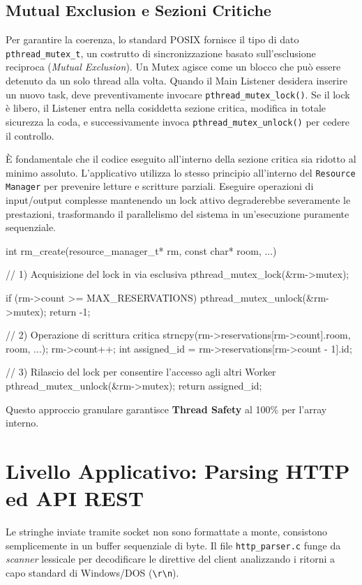 \documentclass[a4paper,12pt]{article}
\begin{document}
\subsection{Mutual Exclusion e Sezioni Critiche}
Per garantire la coerenza, lo standard POSIX fornisce il tipo di dato \texttt{pthread\_mutex\_t}, un costrutto di sincronizzazione basato sull'esclusione reciproca (\textit{Mutual Exclusion}). Un Mutex agisce come un blocco che può essere detenuto da un solo thread alla volta. Quando il Main Listener desidera inserire un nuovo task, deve preventivamente invocare \texttt{pthread\_mutex\_lock()}. Se il lock è libero, il Listener entra nella cosiddetta sezione critica, modifica in totale sicurezza la coda, e successivamente invoca \texttt{pthread\_mutex\_unlock()} per cedere il controllo. 

È fondamentale che il codice eseguito all'interno della sezione critica sia ridotto al minimo assoluto. L'applicativo utilizza lo stesso principio all'interno del \texttt{Resource Manager} per prevenire letture e scritture parziali. Eseguire operazioni di input/output complesse mantenendo un lock attivo degraderebbe severamente le prestazioni, trasformando il parallelismo del sistema in un'esecuzione puramente sequenziale.

\begin{ccode}
int rm_create(resource_manager_t* rm, const char* room, ...) {
    // 1) Acquisizione del lock in via esclusiva
    pthread_mutex_lock(&rm->mutex);
    
    if (rm->count >= MAX_RESERVATIONS) {
        pthread_mutex_unlock(&rm->mutex);
        return -1;
    }
    
    // 2) Operazione di scrittura critica
    strncpy(rm->reservations[rm->count].room, room, ...);
    rm->count++;
    int assigned_id = rm->reservations[rm->count - 1].id;
    
    // 3) Rilascio del lock per consentire l'accesso agli altri Worker
    pthread_mutex_unlock(&rm->mutex);
    return assigned_id;
}
\end{ccode}

Questo approccio granulare garantisce \textbf{Thread Safety} al 100\% per l'array interno.

\newpage
\section{Livello Applicativo: Parsing HTTP ed API REST}

Le stringhe inviate tramite socket non sono formattate a monte, consistono semplicemente in un buffer sequenziale di byte. Il file \texttt{http\_parser.c} funge da \textit{scanner} lessicale per decodificare le direttive del client analizzando i ritorni a capo standard di Windows/DOS (\texttt{\textbackslash r\textbackslash n}).
\end{document}
